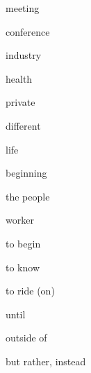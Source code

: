 \begin{flashcard}{\LARGE meeting}
\LARGE {}
\end{flashcard}
\begin{flashcard}{\LARGE conference}
\LARGE {}
\end{flashcard}
\begin{flashcard}{\LARGE industry}
\LARGE {}
\end{flashcard}
\begin{flashcard}{\LARGE health}
\LARGE {}
\end{flashcard}
\begin{flashcard}{\LARGE private}
\LARGE {}
\end{flashcard}
\begin{flashcard}{\LARGE different}
\LARGE {}
\end{flashcard}
\begin{flashcard}{\LARGE life}
\LARGE {}
\end{flashcard}
\begin{flashcard}{\LARGE beginning}
\LARGE {}
\end{flashcard}
\begin{flashcard}{\LARGE the people}
\LARGE {}
\end{flashcard}
\begin{flashcard}{\LARGE worker}
\LARGE {}
\end{flashcard}
\begin{flashcard}{\LARGE to begin}
\LARGE {}
\end{flashcard}
\begin{flashcard}{\LARGE to know}
\LARGE {}
\end{flashcard}
\begin{flashcard}{\LARGE to ride (on)}
\LARGE {}
\end{flashcard}
\begin{flashcard}{\LARGE until}
\LARGE {}
\end{flashcard}
\begin{flashcard}{\LARGE outside of}
\LARGE {}
\end{flashcard}
\begin{flashcard}{\LARGE but rather, instead}
\LARGE {}
\end{flashcard}

